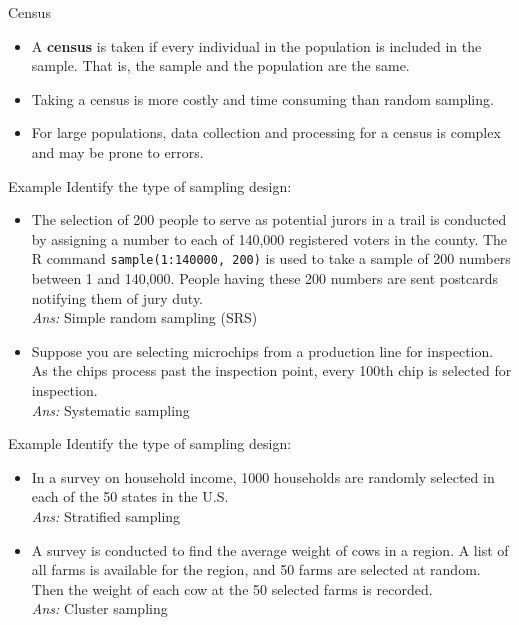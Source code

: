\documentclass{beamer}
\begin{document}
\begin{frame}{Census}
\begin{itemize}
\item A \textbf{census} is taken if every individual in the population is included in the sample.  That is, the sample and the population are the same.
\vspace{5pt}
\item Taking a census is more costly and time consuming than random sampling.
\vspace{5pt}
\item For large populations, data collection and processing for a census is complex and may be prone to errors.
\end{itemize}
\end{frame}

\begin{frame}{Example}
Identify the type of sampling design:\\
\vspace{10pt}
\begin{itemize}
\item The selection of 200 people to serve as potential jurors in a trail is conducted by assigning a number to each of 140,000 registered voters in the county.  The R command \texttt{sample(1:140000, 200)} is used to take a sample of 200 numbers between 1 and 140,000.  People having these 200 numbers are sent postcards notifying them of jury duty.\\
{\color{blue} \emph{Ans:} Simple random sampling (SRS)}
\vspace{5pt}
\item Suppose you are selecting microchips from a production line for inspection.  As the chips process past the inspection point, every 100th chip is selected for inspection.\\
{\color{blue} \emph{Ans:} Systematic sampling}
\end{itemize} 
\end{frame}

\begin{frame}{Example}
Identify the type of sampling design:\\
\vspace{10pt}
\begin{itemize}
\item In a survey on household income, 1000 households are randomly selected in each of the 50 states in the U.S.\\
{\color{blue} \emph{Ans:} Stratified sampling}
\vspace{5pt}  
\item A survey is conducted to find the average weight of cows in a region.  A list of all farms is available for the region, and 50 farms are selected at random.  Then the weight of each cow at the 50 selected farms is recorded.\\
{\color{blue} \emph{Ans:} Cluster sampling}
\end{itemize}
\end{frame}
\end{document}
